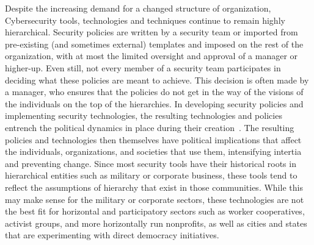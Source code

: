 
Despite the increasing demand for a changed structure of organization, 
Cybersecurity tools, technologies and techniques continue to remain highly 
hierarchical. Security policies are written by a security team or imported from
pre-existing (and sometimes external) templates and imposed on the rest of the
organization, with at most the limited oversight and approval of a manager or
higher-up. Even still, not every member of a security team participates
in deciding what these policies are meant to achieve. This decision is often
made by a manager, who ensures that the policies do not get in the way of the
visions of the individuals on the top of the hierarchies. In developing
security policies and implementing security technologies, the resulting
technologies and policies entrench the political dynamics in place during their
creation~\cite{winner1980artifacts}. The resulting policies and technologies
then themselves have political implications that affect the individuals,
organizations, and societies that use them, intensifying intertia and preventing
change. Since most security tools have their historical roots in hierarchical
entities such as military or corporate business, these tools tend to reflect the
assumptions of hierarchy that exist in those communities. While this may make
sense for the military or corporate sectors, these technologies are not the best
fit for horizontal and participatory sectors such as worker cooperatives,
activist groups, and more horizontally run nonprofits, as well as cities and
states that are experimenting with direct democracy initiatives.


